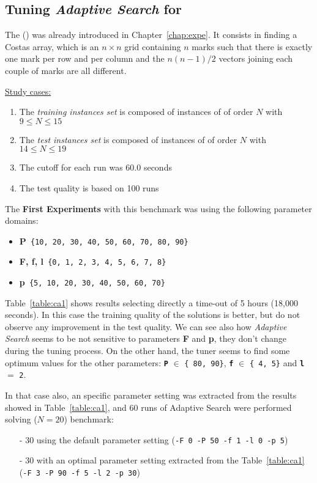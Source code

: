 
\subsection{ Tuning {\it Adaptive Search} for \carrp}

The \carrp{} (\CARRP) was already introduced in Chapter~\ref{chap:expe}. It consists in finding a Costas array, which is an $n\times n$ grid containing $n$ marks such that there is exactly one mark per row and per column and the $n(n-1)/2$ vectors joining each couple of marks are all different.

\underline{Study cases:}
\begin{enumerate}
	\item The {\it training instances set} is composed of instances of \CARRP{} of order $N$ with $9 \leq N \leq 15$
	\item The {\it test instances set} is composed of instances of \CARRP{} of order $N$ with $14 \leq N \leq 19$
	\item The cutoff for each run was 60.0 seconds
	\item The test quality is based on 100 runs
\end{enumerate}

The {\bf First Experiments} with this benchmark was using the following parameter domains:
\begin{itemize}[itemsep=0.2mm]
	\item {\bf P}\texttt{ \{10, 20, 30, 40, 50, 60, 70, 80, 90\}}
	\item {\bf F, f, l}\texttt{ \{0, 1, 2, 3, 4, 5, 6, 7, 8\}}
	\item {\bf p}\texttt{ \{5, 10, 20, 30, 40, 50, 60, 70\}}
\end{itemize}

Table~\ref{table:ca1} shows results selecting directly a time-out of 5 hours (18,000 seconds). In this case the training quality of the solutions is better, but do not observe any improvement in the test quality. We can see also how {\it Adaptive Search} seems to be not sensitive to parameters {\bf F} and {\bf p}, \ie they don't change during the tuning process. On the other hand, the tuner seems to find some optimum values for the other parameters: \texttt{\bf P} $\in$ \texttt{\{ 80, 90\}}, \texttt{\bf f} $\in$ \texttt{\{ 4, 5\}} and \texttt{\bf l} $=$ \texttt{2}.

In that case also, an specific parameter setting was extracted from the results showed in Table~\ref{table:ca1}, and 60 runs of Adaptive Search were performed solving \CARRP{} ($N = 20$) benchmark: 
\begin{itemize}
	\item[-] 30 using the default parameter setting (\texttt{-F 0 -P 50 -f 1 -l 0 -p 5})
	\item[-] 30 with an optimal parameter setting extracted from the Table~\ref{table:ca1} (\texttt{-F 3 -P 90 -f 5 -l 2 -p 30}) 
\end{itemize}

